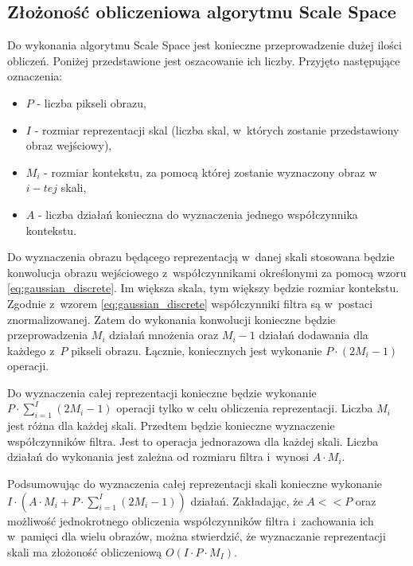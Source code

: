 \subsection{Złożoność obliczeniowa algorytmu Scale Space}
\label{subsec:zlozonosc_obliczeniowa}

Do wykonania algorytmu Scale Space jest konieczne przeprowadzenie dużej ilości obliczeń. Poniżej przedstawione jest oszacowanie ich liczby. Przyjęto następujące oznaczenia:
\begin{itemize}
\item $ P $ - liczba pikseli obrazu,
\item $ I $ - rozmiar reprezentacji skal (liczba skal, w~których zostanie przedstawiony obraz wejściowy),
\item $ M_i $ - rozmiar kontekstu, za pomocą której zostanie wyznaczony obraz w $ i-tej $ skali,
\item $ A $ - liczba działań konieczna do wyznaczenia jednego współczynnika kontekstu.
\end{itemize}

Do wyznaczenia obrazu będącego reprezentacją w~danej skali stosowana będzie konwolucja obrazu wejściowego z~współczynnikami określonymi za pomocą wzoru \eqref{eq:gaussian_discrete}. Im większa skala, tym większy będzie rozmiar kontekstu. Zgodnie z~wzorem \eqref{eq:gaussian_discrete} współczynniki filtra są w~postaci znormalizowanej. Zatem do wykonania konwolucji konieczne będzie przeprowadzenia $ M_i $ działań mnożenia oraz $ M_i - 1 $ działań dodawania dla każdego z~$P$ pikseli obrazu. Łącznie, koniecznych jest wykonanie $ P \cdot (2M_i - 1) $ operacji.

Do wyznaczenia całej reprezentacji konieczne będzie wykonanie 
$ P \cdot \sum_{i=1}^I(2 M_i - 1) $ operacji tylko w celu obliczenia reprezentacji. Liczba $ M_i $ jest różna dla każdej skali. Przedtem będzie konieczne wyznaczenie współczynników filtra. Jest to operacja jednorazowa dla każdej skali. Liczba działań do wykonania jest zależna od rozmiaru filtra i~wynosi $ A \cdot M_i $.

Podsumowując do wyznaczenia całej reprezentacji skali konieczne wykonanie $ I \cdot (A \cdot M_i + P \cdot \sum_{i=1}^I(2 M_i - 1)) $ działań. Zakładając, że $ A << P $ oraz możliwość jednokrotnego obliczenia współczynników filtra i~zachowania ich w~pamięci dla wielu obrazów, można stwierdzić, że wyznaczanie reprezentacji skali ma złożoność obliczeniową $ O(I \cdot P \cdot M_I) $.

